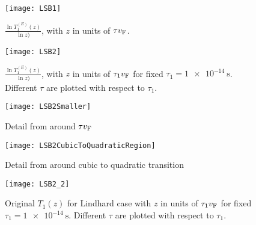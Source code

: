 \documentclass[../main.tex]{subfiles}
\begin{document}
	\begin{figure}[htp]
		\centering
		\texttt{[image: LSB1]}
		\caption{$\frac{\ln{T_{1}^{(E)}(z)}}{\ln{z})}$, with $z$ in units of $\tau v_{\mathrm{F}}$.}\label{fig:lsb:scale1}
	\end{figure}

	\begin{figure}[htp]
		\centering
		\texttt{[image: LSB2]}
		\caption{$\frac{\ln{T_{1}^{(E)}(z)}}{\ln{z})}$, with $z$ in units of $\tau_1 v_{\mathrm{F}}$ for fixed $\tau_1=\SI{1e-14}{\second}$.
		Different $\tau$ are plotted with respect to $\tau_1$.}\label{fig:lsb:scale2}
	\end{figure}

	\begin{figure}[htp]
		\centering
		\texttt{[image: LSB2Smaller]}
		\caption{Detail from  around $\tau v_{\mathrm{F}}$}\label{fig:lsb:scaleInflection1}
	\end{figure}

	\begin{figure}[htp]
		\centering
		\texttt{[image: LSB2CubicToQuadraticRegion]}
		\caption{Detail from  around cubic to quadratic transition}\label{fig:lsb:scaleInflection2}
	\end{figure}

	\begin{figure}[htp]
		\centering
		\texttt{[image: LSB2\_2]}
		\caption{Original $T_1(z)$ for Lindhard case with $z$ in units of $\tau_1 v_{\mathrm{F}}$ for fixed $\tau_1=\SI{1e-14}{\second}$.
		Different $\tau$ are plotted with respect to $\tau_1$.}\label{fig:lsb:scale2.2}
	\end{figure}
\end{document}
